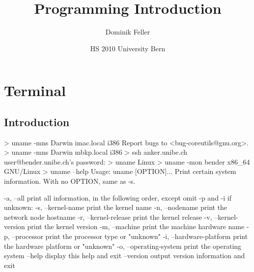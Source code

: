 \documentclass[10pt,a4paper]{scrartcl}
\date{HS 2010 University Bern}
\author{Dominik Feller}
\title{Programming Introduction}
\begin{document}
\maketitle

\tableofcontents

\newpage

\section{Terminal}
\subsection{Introduction}

\begin{terminalcode}
> uname -mns
  Darwin imac.local i386
  Report bugs to <bug-coreutils@gnu.org>.
> uname -mns
  Darwin mbkp.local i386
> ssh anker.unibe.ch
  user@bender.unibe.ch's password: 
> uname
  Linux
> uname -mon
  bender x86_64 GNU/Linux
> uname --help
  Usage: uname [OPTION]...
  Print certain system information.  With no OPTION, same as -s.
  
    -a, --all                print all information, in the following order,
                               except omit -p and -i if unknown:
    -s, --kernel-name        print the kernel name
    -n, --nodename           print the network node hostname
    -r, --kernel-release     print the kernel release
    -v, --kernel-version     print the kernel version
    -m, --machine            print the machine hardware name
    -p, --processor          print the processor type or "unknown"
    -i, --hardware-platform  print the hardware platform or "unknown"
    -o, --operating-system   print the operating system
        --help     display this help and exit
        --version  output version information and exit
\end{terminalcode}
\end{document}
